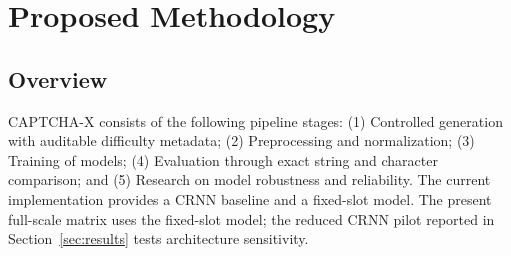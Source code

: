 \documentclass[pdflatex,sn-mathphys-num,iicol]{sn-jnl}
\begin{document}
\begin{table}[!htbp]
\centering
\caption{Pixel-level verification results for the corrected \texttt{pil\_controlled}
generator and the closest available captcha-library clean reference.
Mean pixel standard deviation $\bar{\sigma}_{\mathrm{px}}$ is reported as a
luminance/stroke-coverage diagnostic, together with the fraction of samples flagged as
clean-mismatch by the verifier. The current artifact set does not include a
separately archived pre-repair original-generator verification run, so
\texttt{captcha\_image}@clean is reported as the closest available clean
captcha-library measurement rather than as a literal pre-repair baseline.}
\label{tab:verifier}
\end{table}
\section{Proposed Methodology}
\label{sec:framework}

\subsection{Overview}

CAPTCHA-X consists of the following pipeline stages: (1) Controlled generation with auditable difficulty metadata; (2) Preprocessing and normalization; (3) Training of models; (4) Evaluation through exact string and character comparison; and (5) Research on model robustness and reliability. The current implementation provides a CRNN baseline and a fixed-slot model. The present full-scale matrix uses the fixed-slot model; the reduced CRNN pilot reported in Section~\ref{sec:results} tests architecture sensitivity.
\end{document}
